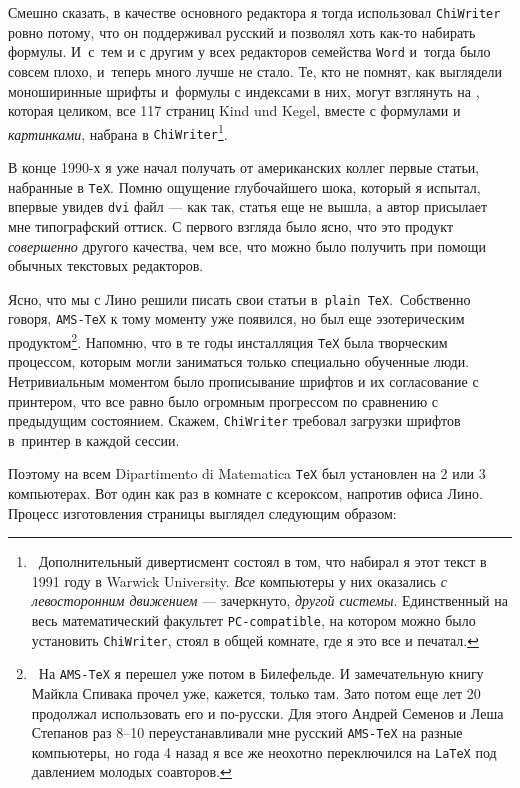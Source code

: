 \documentclass[intlimits,twoside,a4paper,11pt]{article}
\begin{document}
	Смешно сказать, в качестве основного редактора я тогда использовал {\tt ChiWriter} 
	ровно потому, что он поддерживал русский и позволял хоть как-то набирать формулы. 
	И~с~тем и с другим у всех редакторов семейства {\tt Word\/} и~тогда было совсем плохо, 
	и~теперь много лучше не стало.
	Те, кто не помнят, как выглядели
	моноширинные шрифты и~формулы с индексами в них, могут взглянуть на \cite{V90},
	которая целиком, все 117 страниц Kind und Kegel, вместе с формулами и {\it картинками\/}, 
	набрана в 
	{\tt ChiWriter}\footnote{~Дополнительный дивертисмент состоял в том, что набирал 
		я этот текст в 1991 году в Warwick University. {\it Все\/} компьютеры у них
		оказались {\it с левосторонним движением\/} --- зачеркнуто, {\it другой системы\/}.
		Единственный на весь математический факультет {\tt PC-compatible}, на котором можно 
		было установить {\tt ChiWriter}, стоял в общей комнате, где я это все и печатал.}.
	\par
	В конце 1990-х я уже начал получать от американских коллег первые статьи,
	набранные в {\tt \TeX}. Помню ощущение глубочайшего шока, который я испытал,
	впервые увидев {\tt dvi} файл --- как так, статья еще не вышла, а автор присылает
	мне типографский оттиск. С первого взгляда было ясно, что это продукт {\it совершенно\/} другого
	качества, чем все, что можно было получить при помощи обычных текстовых
	редакторов. 
	
	Ясно, что мы с Лино решили писать свои статьи в \,{\tt plain \TeX}. \,Собственно говоря,
	{\tt AMS-\TeX} к тому моменту уже появился, но был еще эзотерическим продуктом\footnote{~На {\tt AMS-\TeX} я перешел уже потом в Билефельде. И замечательную
		книгу Майкла Спивака \cite{Sp} прочел уже, кажется, только там. Зато потом 
		еще лет 20 продолжал использовать его и по-русски. Для этого Андрей Семенов и Леша
		Степанов раз 8--10 переустанавливали мне русский {\tt AMS-\TeX} на разные компьютеры, 
		но года 4 назад я все же
		неохотно переключился на {\tt \LaTeX} под давлением молодых соавторов.}.
	Напомню, что в те годы инсталляция {\tt \TeX} была творческим процессом, которым 
	могли заниматься только специально обученные люди. Нетривиальным моментом
	было прописывание шрифтов и их согласование с принтером, что все равно
	было огромным прогрессом по сравнению с предыдущим состоянием. Скажем,
	{\tt ChiWriter} требовал загрузки шрифтов в~принтер в каждой сессии.
	
	Поэтому на всем Dipartimento di Matematica {\tt \TeX} был установлен на 2 или 3 
	компьютерах. Вот один как раз в комнате с ксероксом,
	напротив офиса Лино. Процесс изготовления страницы выглядел следующим образом:
	
\end{document}
